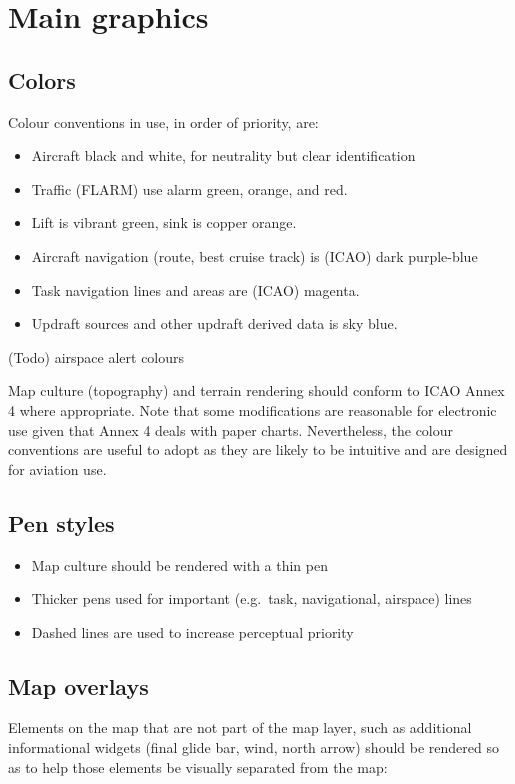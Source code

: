 \documentclass[a4paper,12pt]{refrep}
\begin{document}
\section{Main graphics}

\subsection{Colors}
Colour conventions in use, in order of priority, are:
\begin{itemize}
\item Aircraft black and white, for neutrality but clear identification
\item Traffic (FLARM) use alarm green, orange, and red.
\item Lift is vibrant green, sink is copper orange.
\item Aircraft navigation (route, best cruise track) is (ICAO) dark purple-blue
\item Task navigation lines and areas are (ICAO) magenta.
\item Updraft sources and other updraft derived data is sky blue.
\end{itemize}

(Todo) airspace alert colours

Map culture (topography) and terrain rendering should conform to ICAO
Annex 4 where appropriate.  Note that some modifications are
reasonable for electronic use given that Annex 4 deals with paper
charts.  Nevertheless, the colour conventions are useful to adopt as they are
likely to be intuitive and are designed for aviation use.

\subsection{Pen styles}

\begin{itemize}
\item Map culture should be rendered with a thin pen
\item Thicker pens used for important (e.g.\ task, navigational, airspace) lines
\item Dashed lines are used to increase perceptual priority
\end{itemize}

\subsection{Map overlays}
Elements on the map that are not part of the map layer, such as additional
informational widgets (final glide bar, wind, north arrow) should be rendered
so as to help those elements be visually separated from the map:
\end{document}
